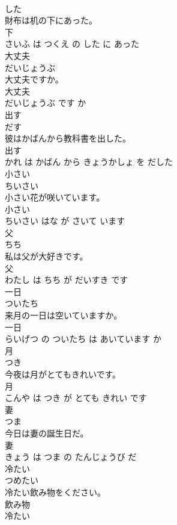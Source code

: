 \documentclass[8pt]{extreport}
\begin{document}
\begin{CJK}{UTF8}{min}
\\	した			
\\	財布は机の下にあった。	
\\	下 
\\	さいふ は つくえ の した に あった			
\\	大丈夫	
\\	だいじょうぶ			
\\	大丈夫ですか。	
\\	大丈夫 
\\	だいじょうぶ です か			
\\	出す	
\\	だす			
\\	彼はかばんから教科書を出した。	
\\	出す 
\\	かれ は かばん から きょうかしょ を だした			
\\	小さい	
\\	ちいさい			
\\	小さい花が咲いています。	
\\	小さい 
\\	ちいさい はな が さいて います			
\\	父	
\\	ちち			
\\	私は父が大好きです。	
\\	父 
\\	わたし は ちち が だいすき です			
\\	一日	
\\	ついたち			
\\	来月の一日は空いていますか。	
\\	一日 
\\	らいげつ の ついたち は あいています か			
\\	月	
\\	つき			
\\	今夜は月がとてもきれいです。	
\\	月 
\\	こんや は つき が とても きれい です			
\\	妻	
\\	つま			
\\	今日は妻の誕生日だ。	
\\	妻 
\\	きょう は つま の たんじょうび だ			
\\	冷たい	
\\	つめたい			
\\	冷たい飲み物をください。	
\\	飲み物 
\\	冷たい 

\end{CJK}
\end{document}

